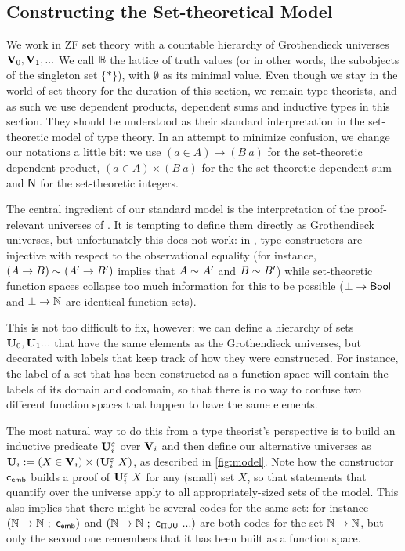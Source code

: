 \subsection{Constructing the Set-theoretical Model}

We work in ZF set theory with a countable hierarchy of Grothendieck universes
\( \mathbf{V}_0, \mathbf{V}_1, ... \)
%
We call \( \mathbb{B} \) the lattice of truth values (or in other words, the
subobjects of the singleton set \( \{ * \} \)), with \( \emptyset \) as its 
minimal value.
%
Even though we stay in the world of set theory for the duration of
this section, we remain type theorists, and as such
we use dependent products, dependent sums and inductive types in this
section. They should be understood as their standard interpretation in
the set-theoretic model of type theory.
%
In an attempt to minimize confusion, we change our notations a little
bit: we use \( (a \in A) \to (B\ a) \) for the set-theoretic dependent product,
\( (a \in A) \times (B\ a) \) for the the set-theoretic dependent sum and
\( \mathsf{N} \) for the set-theoretic integers.

The central ingredient of our standard model is the interpretation of the
proof-relevant universes of \SetoidCC.
%
It is tempting to define them directly as Grothendieck universes, but 
unfortunately this does not work: in \SetoidCC, type constructors are 
injective with respect to the observational equality
(for instance, \( ({A} \to {B}) \sim_{} ({A'} \to {B'}) \) implies that
\( A \sim_{} A' \) and \( B \sim_{} B' \)) while set-theoretic function
spaces collapse too much information for this to be possible
(\( {\bot} \to {\mathsf{Bool}} \) and \( {\bot} \to {\mathbb{N}} \) are identical function 
sets).

This is not too difficult to fix, however: 
% 
we can define a hierarchy of sets \( \mathbf{U}_0 , \mathbf{U}_1 ... \) that have the same 
elements as the Grothendieck universes, but decorated with labels that keep 
track of how they were constructed. For instance, the label of a set that has 
been constructed as a function space will contain the labels of its domain and 
codomain, so that there is no way to confuse two different function spaces that happen
to have the same elements. 

The most natural way to do this from a type
theorist's perspective is to build an inductive predicate \( \mathbf{U}^{\varepsilon}_i \) over
\( \mathbf{V}_i \) and then define our alternative universes as
\( \mathbf{U}_i := (X \in \mathbf{V}_i)\times(\mathbf{U}^{\varepsilon}_i\ X) \), as described in \cref{fig:model}.
%
Note how the constructor \( \mathsf{c}_\mathsf{emb} \) builds a proof of \( \mathbf{U}^{\varepsilon}_i\ X \)
for any (small) set \( X \), so that \SetoidCC statements that quantify over
the universe apply to all appropriately-sized sets of the model.
%
This also implies that there might be several codes for the
same set: for instance \( ({\mathbb{N}} \to {\mathbb{N}} \ ;\ \mathsf{c}_\mathsf{emb}) \) and
\( ({\mathbb{N}} \to {\mathbb{N}} \ ;\ \mathsf{c}_{\Pi\mathsf{UU}}\ ...) \) are both codes for
the set \( {\mathbb{N}} \to {\mathbb{N}} \), but only the second one remembers that it
has been built as a function space.

